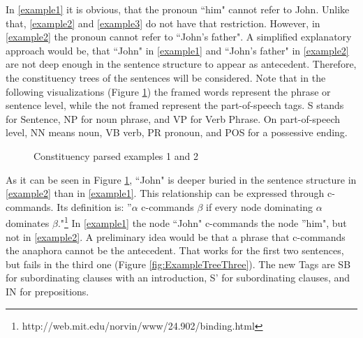 In \ref{example1} it is obvious, that the pronoun ``him" cannot refer to John. Unlike that, \ref{example2} and \ref{example3} do not have that restriction. However, in \ref{example2} the pronoun cannot refer to ``John's father". A simplified explanatory approach would be, that ``John" in \ref{example1} and ``John's father" in \ref{example2} are not deep enough in the sentence structure to appear as antecedent. Therefore, the constituency trees of the sentences will be considered. Note that in the following visualizations (Figure \ref{fig:twoTreeExample}) the framed words represent the phrase or sentence level, while the not framed represent the part-of-speech tags. S stands for Sentence, NP for noun phrase, and VP for Verb Phrase. On part-of-speech level, NN means noun, VB verb, PR pronoun, and POS for a possessive ending. 

\begin{figure}[h]
    \centering\sffamily
{}
    \caption{Constituency parsed examples 1 and 2}%
    \label{fig:twoTreeExample}%
\end{figure}

As it can be seen in Figure \ref{fig:twoTreeExample}, ``John" is deeper buried in the sentence structure in \ref{example2} than in \ref{example1}. This relationship can be expressed through c-commands. Its definition is: ''$\alpha$ c-commands $\beta$ if every node dominating $\alpha$ dominates $\beta$."\footnote{http://web.mit.edu/norvin/www/24.902/binding.html} In \ref{example1} the node ``John" c-commands the node ''him", but not in \ref{example2}. A preliminary idea would be that a phrase that c-commands the anaphora cannot be the antecedent. That works for the first two sentences, but fails in the third one (Figure \ref{fig:ExampleTreeThree}). The new Tags are SB for subordinating clauses with an introduction, S' for subordinating clauses, and IN for prepositions.

